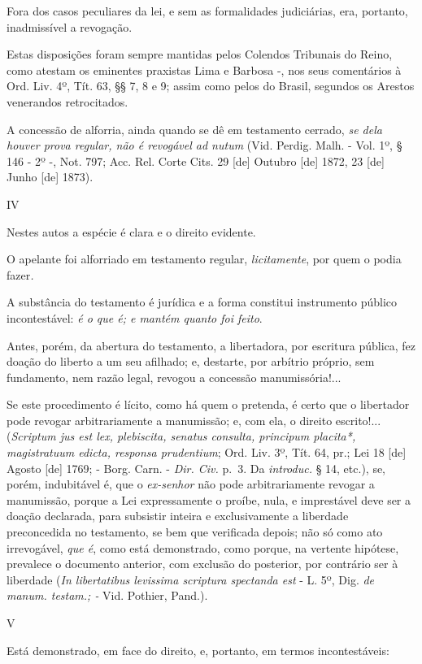 Fora dos casos peculiares da lei, e sem as formalidades judiciárias,
era, portanto, inadmissível a revogação.

Estas disposições foram sempre mantidas pelos Colendos Tribunais do
Reino, como atestam os eminentes praxistas Lima e Barbosa -, nos seus
comentários à Ord. Liv. 4º, Tít. 63, §§ 7, 8 e 9; assim como pelos do
Brasil, segundos os Arestos venerandos retrocitados.

A concessão de alforria, ainda quando se dê em testamento cerrado,
\emph{se dela houver prova regular, não é revogável ad nutum} (Vid.
Perdig. Malh. - Vol. 1º, § 146 - 2º -, Not. 797; Acc. Rel. Corte Cits.
29 {[}de{]} Outubro {[}de{]} 1872, 23 {[}de{]} Junho {[}de{]} 1873).

IV

Nestes autos a espécie é clara e o direito evidente.

O apelante foi alforriado em testamento regular, \emph{licitamente}, por
quem o podia fazer\emph{.}

A substância do testamento é jurídica e a forma constitui instrumento
público incontestável: \emph{é o que é; e mantém quanto foi feito}.

Antes, porém, da abertura do testamento, a libertadora, por escritura
pública, fez doação do liberto a um seu afilhado; e, destarte, por
arbítrio próprio, sem fundamento, nem razão legal, revogou a concessão
manumissória!...

Se este procedimento é lícito, como há quem o pretenda, é certo que o
libertador pode revogar arbitrariamente a manumissão; e, com ela, o
direito escrito!... (\emph{Scriptum jus est lex, plebiscita, senatus
consulta, principum placita*, magistratuum edicta, responsa prudentium};
Ord. Liv. 3º, Tít. 64, pr.; Lei 18 {[}de{]} Agosto {[}de{]} 1769; -
Borg. Carn. - \emph{Dir. Civ.} p.~3. Da \emph{introduc.} § 14, etc.),
se, porém, indubitável é, que o \emph{ex-senhor} não pode
arbitrariamente revogar a manumissão, porque a Lei expressamente o
proíbe, nula, e imprestável deve ser a doação declarada, para subsistir
inteira e exclusivamente a liberdade preconcedida no testamento, se bem
que verificada depois; não só como ato irrevogável, \emph{que é}, como
está demonstrado, como porque, na vertente hipótese, prevalece o
documento anterior, com exclusão do posterior, por contrário ser à
liberdade (\emph{In libertatibus levissima scriptura spectanda est} - L.
5º, Dig. \emph{de manum. testam.; -} Vid. Pothier, Pand.).

V

Está demonstrado, em face do direito, e, portanto, em termos
incontestáveis:

